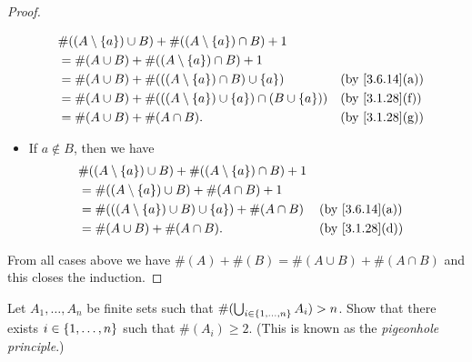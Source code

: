\begin{proof}
\begin{itemize}
\begin{align*}
             & \#((A \setminus \set{a}) \cup B) + \#((A \setminus \set{a}) \cap B) + 1                                           \\
             & = \#(A \cup B) + \#((A \setminus \set{a}) \cap B) + 1                                                             \\
             & = \#(A \cup B) + \#(((A \setminus \set{a}) \cap B) \cup \set{a})                &  & \text{(by \cref{3.6.14}(a))} \\
             & = \#(A \cup B) + \#(((A \setminus \set{a}) \cup \set{a}) \cap (B \cup \set{a})) &  & \text{(by \cref{3.1.28}(f))} \\
             & = \#(A \cup B) + \#(A \cap B).                                                  &  & \text{(by \cref{3.1.28}(g))}
          \end{align*}
    \item If \(a \notin B\), then we have
          \begin{align*}
             & \#((A \setminus \set{a}) \cup B) + \#((A \setminus \set{a}) \cap B) + 1                                   \\
             & = \#((A \setminus \set{a}) \cup B) + \#(A \cap B) + 1                                                     \\
             & = \#(((A \setminus \set{a}) \cup B) \cup \set{a}) + \#(A \cap B)        &  & \text{(by \cref{3.6.14}(a))} \\
             & = \#(A \cup B) + \#(A \cap B).                                          &  & \text{(by \cref{3.1.28}(d))}
          \end{align*}
  \end{itemize}
  From all cases above we have \(\#(A) + \#(B) = \#(A \cup B) + \#(A \cap B)\) and this closes the induction.
\end{proof}

\begin{ex}\label{ex:3.6.10}
  Let \(A_1, \dots, A_n\) be finite sets such that \(\#(\bigcup_{i \in \left\lbrace1, \dots, n\right\rbrace} A_i) > n\).
  Show that there exists \(i \in \left\lbrace1, \dots, n\right\rbrace\) such that \(\#(A_i) \geq 2\).
  (This is known as the \emph{pigeonhole principle}.)
\end{ex}

